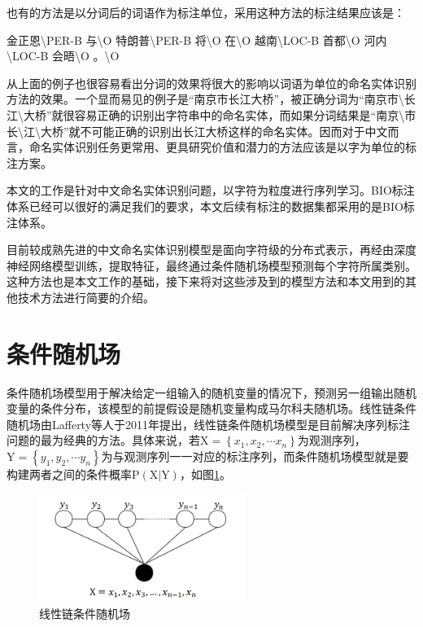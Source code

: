 \documentclass[winfonts,master,oneside,nobackinfo]{njuthesis}
\begin{document}
也有的方法是以分词后的词语作为标注单位，采用这种方法的标注结果应该是：

金正恩\textbackslash PER-B 与\textbackslash O 特朗普\textbackslash PER-B 将\textbackslash O 在\textbackslash O 越南\textbackslash LOC-B 首都\textbackslash O 河内\textbackslash LOC-B 会晤\textbackslash O 。\textbackslash O

从上面的例子也很容易看出分词的效果将很大的影响以词语为单位的命名实体识别方法的效果。一个显而易见的例子是“南京市长江大桥”，被正确分词为“南京市\textbackslash 长江\textbackslash 大桥”就很容易正确的识别出字符串中的命名实体，而如果分词结果是“南京\textbackslash 市长\textbackslash 江\textbackslash 大桥”就不可能正确的识别出长江大桥这样的命名实体。因而对于中文而言，命名实体识别任务更常用、更具研究价值和潜力的方法应该是以字为单位的标注方案。

本文的工作是针对中文命名实体识别问题，以字符为粒度进行序列学习。BIO标注体系已经可以很好的满足我们的要求，本文后续有标注的数据集都采用的是BIO标注体系。

目前较成熟先进的中文命名实体识别模型是面向字符级的分布式表示，再经由深度神经网络模型训练，提取特征，最终通过条件随机场模型预测每个字符所属类别。这种方法也是本文工作的基础，接下来将对这些涉及到的模型方法和本文用到的其他技术方法进行简要的介绍。

\section{条件随机场}
条件随机场模型用于解决给定一组输入的随机变量的情况下，预测另一组输出随机变量的条件分布，该模型的前提假设是随机变量构成马尔科夫随机场。线性链条件随机场由Lafferty等人\cite{Lafferty}于2011年提出，线性链条件随机场模型是目前解决序列标注问题的最为经典的方法。具体来说，若$\mathrm { X } = \left\{ x _ { 1 } , x _ { 2 } , \cdots x _ { n } \right\}$为观测序列，$\mathrm { Y } = \left\{ y _ { 1 } , y _ { 2 } ,  \cdots y _ { n } \right\}$为与观测序列一一对应的标注序列，而条件随机场模型就是要构建两者之间的条件概率$\mathrm { P } ( \mathrm { X } | \mathrm { Y } )$，如图\ref{crf}。

\begin{figure}[h]
\centering
\includegraphics[width=0.6\textwidth]{./figure/线性链条件随机场.jpg}
\caption{线性链条件随机场}
\label{crf}
\end{figure}
\end{document}
